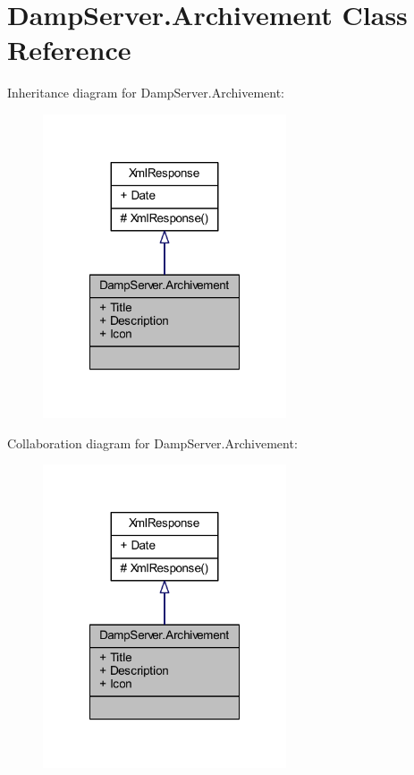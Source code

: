\hypertarget{class_damp_server_1_1_archivement}{\section{Damp\-Server.\-Archivement Class Reference}
\label{class_damp_server_1_1_archivement}
}


Inheritance diagram for Damp\-Server.\-Archivement\-:\nopagebreak
\begin{figure}[H]
\begin{center}
\leavevmode
\includegraphics[width=204pt]{class_damp_server_1_1_archivement__inherit__graph}
\end{center}
\end{figure}


Collaboration diagram for Damp\-Server.\-Archivement\-:\nopagebreak
\begin{figure}[H]
\begin{center}
\leavevmode
\includegraphics[width=204pt]{class_damp_server_1_1_archivement__coll__graph}
\end{center}
\end{figure}
